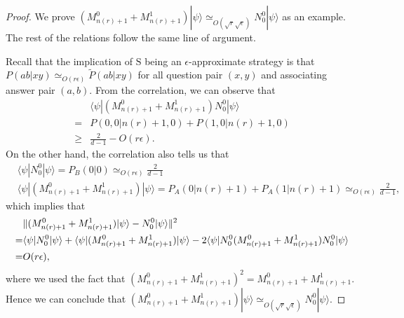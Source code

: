 \documentclass[11pt,letterpaper]{article}
\newcommand{\ket}[1]{|#1\rangle}
\newcommand{\bra}[1]{\langle#1|}
\DeclarePairedDelimiter{\norm}{\lVert}{\rVert}
\newcommand{\1}{\mathbb{1}}
\newcommand{\nr}{n(r)}
\newcommand{\bS}{\mathrm{S}}
\newcommand{\pr}[2]{P(#1|#2)}
\newcommand{\pa}[2]{P_A(#1|#2)}
\newcommand{\pb}[2]{P_B(#1|#2)}
\newcommand{\tpr}[2]{\tilde{P}(#1|#2)}
\newcommand{\ep}{\epsilon}
\newcommand{\se}{\sqrt{\epsilon}}
\newcommand{\sr}{\sqrt{r}}
\newcommand{\appd}[1]{\simeq_{#1}}
\theoremstyle{definition}
\begin{document}
\begin{proof} 
We prove $(M_{\nr+1}^0+M_{\nr+1}^1)\ket{\psi} \appd{O(\sr \se)} N_0^0 \ket{\psi}$ as an example.
The rest of the relations follow the same line of argument.

Recall that the implication of $\bS$ being an $\ep$-approximate strategy is that 
$\pr{ab}{xy} \appd{O(r \ep)} \tpr{ab}{xy}$ for all question 
pair $(x,y)$ and associating answer pair $(a,b)$.
From the correlation, we can observe that
\begin{align*}
 &\bra{\psi} (M_{\nr+1}^0+M_{\nr+1}^1)N_0^0 \ket{\psi} \\
 = &\pr{0,0}{\nr+1,0} + \pr{1,0}{\nr+1,0}\\
 \geq &\frac{2}{d-1} - O(r \ep).
\end{align*}
On the other hand, the correlation also tells us that 
\begin{align*}
	&\bra{\psi} N_0^0 \ket{\psi} = \pb{0}{0} \appd{O(r\ep)} \frac{2}{d-1}\\
 &\bra{\psi}(M_{\nr+1}^0+M_{\nr+1}^1)\ket{\psi} 
 = \pa{0}{\nr+1} + \pa{1}{\nr+1}
 \appd{O(r\ep)} \frac{2}{d-1},
\end{align*}
which implies that 
\begin{align*}
	&\norm{(M_{\nr+1}^0 + M_{\nr+1}^1) \ket{\psi} - N_0^0 \ket{\psi}}^2 \\
	= &\bra{\psi} N_0^0 \ket{\psi}+\bra{\psi}(M_{\nr+1}^0+M_{\nr+1}^1)\ket{\psi} - 2\bra{\psi}N_0^0(M_{\nr+1}^0 + M_{\nr+1}^1)N_0^0 \ket{\psi}\\
	= &O(r \ep),
\end{align*}
where we used the fact that $(M_{\nr+1}^0 + M_{\nr+1}^1)^2 = M_{\nr+1}^0 + M_{\nr+1}^1$.
Hence we can conclude that $(M_{\nr+1}^0 + M_{\nr+1}^1)\ket{\psi} \appd{O(\sr \se)} N_0^0\ket{\psi}$.
\end{proof}
\end{document}
